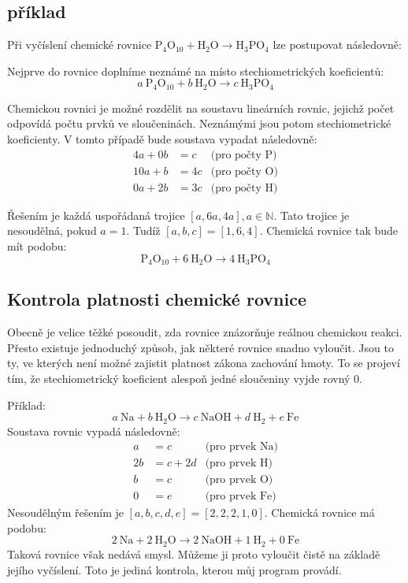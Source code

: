 \documentclass[12pt,a4paper]{report}
\newcommand{\n}[1]{\mbox{#1}}
\newcommand{\sipka}{\rightarrow}
\begin{document}
\subsection{příklad}
Při vyčíslení chemické rovnice $ \n{P}_4\n{O}_{10} + \n{H}_2\n{O} \sipka \n{H}_3\n{PO}_4 $ lze postupovat následovně:

Nejprve do rovnice doplníme neznámé na místo stechiometrických koeficientů:
$$ a~\n{P}_4\n{O}_{10} + b~\n{H}_2\n{O} \sipka c~\n{H}_3\n{PO}_4 $$

Chemickou rovnici je možné rozdělit na soustavu lineárních rovnic, jejichž počet odpovídá počtu prvků ve sloučeninách. Neznámými jsou potom stechio\-met\-ric\-ké koeficienty. V tomto případě bude soustava vypadat následovně:
\begin{align*}
	4a + 0b &= c&\mbox{(pro počty P)}\\
	10a + b &= 4c&\mbox{(pro počty O)}\\
	0a + 2b &= 3c&\mbox{(pro počty H)}
\end{align*}

Řešením je každá uspořádaná trojice $ [a, 6a, 4a], a\in \mathbb{N} $. Tato trojice je nesoudělná, pokud $ a = 1 $. Tudíž $ [a,b,c] = [1,6,4] $. Chemická rovnice tak bude mít podobu:
$$ \n{P}_4\n{O}_{10} + 6~\n{H}_2\n{O} \sipka 4~\n{H}_3\n{PO}_4 $$

\subsection{Kontrola platnosti chemické rovnice}
Obecně je velice těžké posoudit, zda rovnice znázorňuje reálnou chemickou reakci. Přesto existuje jednoduchý způsob, jak některé rovnice snadno vyloučit. Jsou to ty, ve kterých není možné zajistit platnost zákona zachování hmoty. To se projeví tím, že stechiometrický koeficient alespoň jedné sloučeniny vyjde rovný 0.

Příklad:
$$a~\n{Na} + b~\n{H}_2\n{O} \sipka c~\n{NaOH}+d~\n{H}_2 + e~\n{Fe}$$
Soustava rovnic vypadá následovně:
\begin{align*}
	a &= c &\mbox{(pro prvek Na)}\\
	2b &= c + 2d &\mbox{(pro prvek H)}\\
	b &= c &\mbox{(pro prvek O)}\\
	0 &= e &\mbox{(pro prvek Fe)}
\end{align*} 
Nesoudělným řešením je $[a,b,c,d,e]=[2,2,2,1,0]$. Chemická rovnice má podobu:
$$2~\n{Na} + 2~\n{H}_2\n{O} \sipka 2~\n{NaOH}+1~\n{H}_2 + 0~\n{Fe}$$
Taková rovnice však nedává smysl. Můžeme ji proto vyloučit čistě na základě jejího vyčíslení. Toto je jediná kontrola, kterou můj program provádí.
\end{document}
